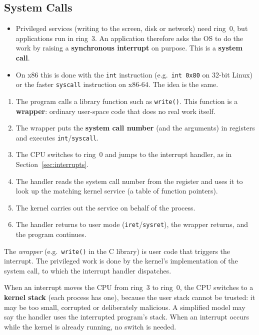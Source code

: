 \documentclass{article}
\begin{document}
\subsection{System Calls}
\label{sec:syscalls}
\begin{itemize}
	\item Privileged services (writing to the screen, disk or network) need ring~0, but applications run in ring~3. An application therefore asks the OS to do the work by raising a \textbf{synchronous interrupt} on purpose. This is a \textbf{system call}.
	\item On x86 this is done with the \texttt{int} instruction (e.g.\ \texttt{int 0x80} on 32-bit Linux) or the faster \texttt{syscall} instruction on x86-64. The idea is the same.
\end{itemize}

\begin{enumerate}
	\item The program calls a library function such as \texttt{write()}. This function is a \textbf{wrapper}: ordinary user-space code that does no real work itself.
	\item The wrapper puts the \textbf{system call number} (and the arguments) in registers and executes \texttt{int}/\texttt{syscall}.
	\item The CPU switches to ring~0 and jumps to the interrupt handler, as in Section~\ref{sec:interrupts}.
	\item The handler reads the system call number from the register and uses it to look up the matching kernel service (a table of function pointers).
	\item The kernel carries out the service on behalf of the process.
	\item The handler returns to user mode (\texttt{iret}/\texttt{sysret}), the wrapper returns, and the program continues.
\end{enumerate}

\begin{pitfall}
	The \emph{wrapper} (e.g.\ \texttt{write()} in the C library) is user code that triggers the interrupt. The privileged work is done by the kernel's implementation of the system call, to which the interrupt handler dispatches.
\end{pitfall}

\begin{extra}
	When an interrupt moves the CPU from ring~3 to ring~0, the CPU switches to a \textbf{kernel stack} (each process has one), because the user stack cannot be trusted: it may be too small, corrupted or deliberately malicious. A simplified model may say the handler uses the interrupted program's stack. When an interrupt occurs while the kernel is already running, no switch is needed.
\end{extra}
\end{document}
